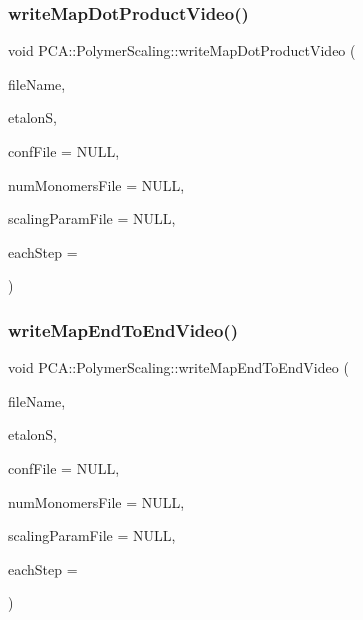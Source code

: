 \hypertarget{class_p_c_a_1_1_polymer_scaling_aec67d14d95d0482dc7dc08155abb0609}{}\label{class_p_c_a_1_1_polymer_scaling_aec67d14d95d0482dc7dc08155abb0609} 
\subsubsection{\texorpdfstring{write\+Map\+Dot\+Product\+Video()}{writeMapDotProductVideo()}}
{\footnotesize\ttfamily void P\+C\+A\+::\+Polymer\+Scaling\+::write\+Map\+Dot\+Product\+Video (\begin{DoxyParamCaption}\item[{char $\ast$}]{file\+Name,  }\item[{const \hyperlink{class_p_c_a_1_1_polymer_scaling_1_1_scaling_param}{Scaling\+Param} \&}]{etalonS,  }\item[{F\+I\+LE $\ast$}]{conf\+File = {\ttfamily NULL},  }\item[{F\+I\+LE $\ast$}]{num\+Monomers\+File = {\ttfamily NULL},  }\item[{F\+I\+LE $\ast$}]{scaling\+Param\+File = {\ttfamily NULL},  }\item[{int}]{each\+Step = {} }\end{DoxyParamCaption})}

\hypertarget{class_p_c_a_1_1_polymer_scaling_a9ef7952c6b05b0614b81752f82f614a4}{}\label{class_p_c_a_1_1_polymer_scaling_a9ef7952c6b05b0614b81752f82f614a4} 
\subsubsection{\texorpdfstring{write\+Map\+End\+To\+End\+Video()}{writeMapEndToEndVideo()}}
{\footnotesize\ttfamily void P\+C\+A\+::\+Polymer\+Scaling\+::write\+Map\+End\+To\+End\+Video (\begin{DoxyParamCaption}\item[{char $\ast$}]{file\+Name,  }\item[{const \hyperlink{class_p_c_a_1_1_polymer_scaling_1_1_scaling_param}{Scaling\+Param} \&}]{etalonS,  }\item[{F\+I\+LE $\ast$}]{conf\+File = {\ttfamily NULL},  }\item[{F\+I\+LE $\ast$}]{num\+Monomers\+File = {\ttfamily NULL},  }\item[{F\+I\+LE $\ast$}]{scaling\+Param\+File = {\ttfamily NULL},  }\item[{int}]{each\+Step = {} }\end{DoxyParamCaption})}



